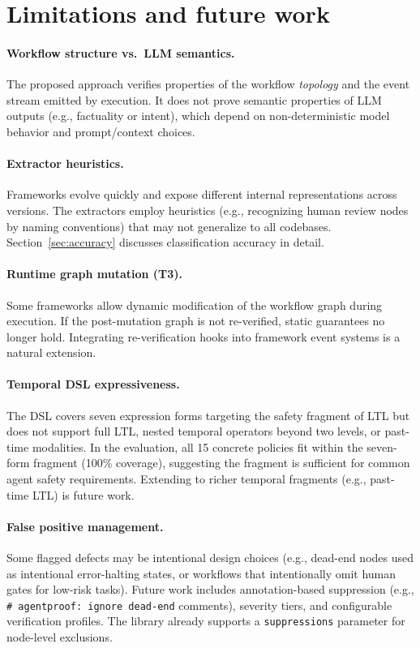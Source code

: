 \section{Limitations and future work}
\label{sec:limitations}

\paragraph{Workflow structure vs.\ LLM semantics.}
The proposed approach verifies properties of the workflow \emph{topology} and
the event stream emitted by execution. It does not prove semantic
properties of LLM outputs (e.g., factuality or intent), which depend
on non-deterministic model behavior and prompt/context choices.

\paragraph{Extractor heuristics.}
Frameworks evolve quickly and expose different internal representations
across versions. The extractors employ heuristics (e.g., recognizing
human review nodes by naming conventions) that may not generalize to
all codebases. Section~\ref{sec:accuracy} discusses classification
accuracy in detail.

\paragraph{Runtime graph mutation (T3).}
Some frameworks allow dynamic modification of the workflow graph during
execution. If the post-mutation graph is not re-verified, static
guarantees no longer hold. Integrating re-verification hooks into
framework event systems is a natural extension.

\paragraph{Temporal DSL expressiveness.}
The DSL covers seven expression forms targeting the safety fragment of
LTL but does not support full LTL, nested temporal operators beyond
two levels, or past-time modalities. In the evaluation, all 15
concrete policies fit within the seven-form fragment (100\% coverage),
suggesting the fragment is sufficient for common agent safety
requirements. Extending to richer temporal fragments (e.g., past-time LTL) is future work.

\paragraph{False positive management.}
Some flagged defects may be intentional design choices (e.g., dead-end
nodes used as intentional error-halting states, or workflows that
intentionally omit human gates for low-risk tasks). Future work
includes annotation-based suppression (e.g.,
\texttt{\# agentproof: ignore dead-end} comments), severity tiers,
and configurable verification profiles. The library already supports
a \texttt{suppressions} parameter for node-level exclusions.

